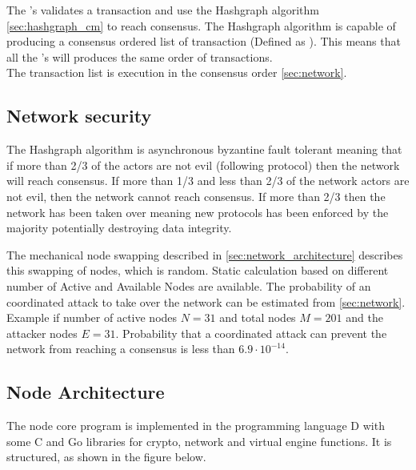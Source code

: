 The 's validates a transaction and use the Hashgraph algorithm \cref{sec:hashgraph_cm} to reach consensus. The Hashgraph algorithm is capable of producing a consensus ordered list of transaction (Defined as ). This means that all the 's will produces the same order of transactions.\\
The transaction list is execution in the consensus order \cref{sec:network}.

\subsection{Network security}

The Hashgraph algorithm is asynchronous byzantine fault tolerant meaning that if more than 2/3 of the actors are not evil (following protocol) then the network will reach consensus. If more than 1/3 and less than 2/3 of the network actors are not evil, then the network cannot reach consensus. If more than 2/3 then the network has been taken over meaning new protocols has been enforced by the majority potentially destroying data integrity. 

The mechanical node swapping described in \cref{sec:network_architecture} describes this swapping of nodes, which is  random. Static calculation based on different number of Active and Available Nodes are available.
The probability of an coordinated attack to take over the network can be estimated from \cref{sec:network}.\\

Example if number of active nodes $N=31$ and total nodes $M=201$ and the attacker nodes $E=31$.
Probability that a coordinated attack can prevent the network from reaching a consensus is less than $6.9 \cdot 10^{-14}$.

\subsection{Node Architecture}
The node core program is implemented in the programming language D with some C and Go libraries for crypto, network and virtual engine functions. It is structured, as shown in the figure below. 

